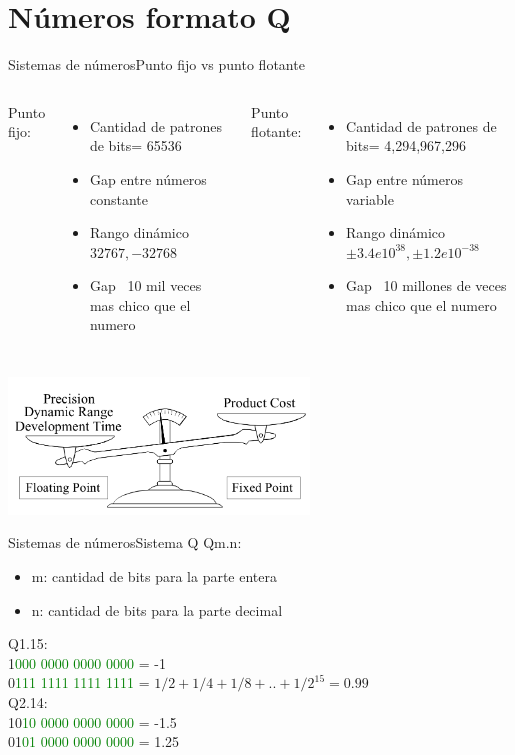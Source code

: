  \section{Números formato Q}
 \begin{frame}{Sistemas de números}{Punto fijo vs punto flotante}
    \begin{columns}[onlytextwidth]
    Punto fijo:
       \scriptsize{
    \begin{itemize}
       \item{Cantidad de patrones de bits= 65536}
       \item{Gap entre números constante }
       \item{Rango dinámico $32767, -32768$}
       \item{Gap ~10 mil veces mas chico que el numero}
    \end{itemize}
 }
    Punto flotante:
       \scriptsize{
    \begin{itemize}
       \item{Cantidad de patrones de bits= 4,294,967,296}
       \item{Gap entre números variable }
       \item{Rango dinámico $\pm3.4 e10^{38},  \pm1.2 e10^{-38}$}
       \item{Gap ~10 millones de veces mas chico que el numero}
    \end{itemize}
 }
    \end{columns}
       \center\includegraphics[width=8cm]{2_clase/fix_vs_float}
    \vfill
 \end{frame}
 \begin{frame}[t]{Sistemas de números}{Sistema Q}
       Qm.n:
       \begin{itemize}
          \item{m: cantidad de bits para la parte entera}
          \item{n: cantidad de bits para la parte decimal}
       \end{itemize}
       Q1.15: \\
          1\textcolor{green}{000 0000 0000 0000} =  -1 \\
          0\textcolor{green}{111 1111 1111 1111} = $1/2+1/4+1/8+..+1/2^{15} = 0.99$ \\
       Q2.14: \\
          10\textcolor{green}{10 0000 0000 0000} =  -1.5 \\
          01\textcolor{green}{01 0000 0000 0000} =  1.25
    \vfill
 \end{frame}
